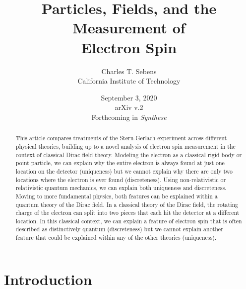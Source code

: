 \documentclass[onecolumn,secnumarabic,amsmath,amssymb,balancelastpage,nofootinbib]{article}
\begin{document}
\sloppy %




\title{\vspace*{-35 pt}\huge{Particles, Fields, and the Measurement of\\Electron Spin}}
\author{Charles T. Sebens\\California Institute of Technology}
\date{September 3, 2020\\arXiv v.2\\Forthcoming in \emph{Synthese}}


\maketitle
\vspace*{-20 pt}
\begin{abstract}
This article compares treatments of the Stern-Gerlach experiment across different physical theories, building up to a novel analysis of electron spin measurement in the context of classical Dirac field theory.  Modeling the electron as a classical rigid body or point particle, we can explain why the entire electron is always found at just one location on the detector (uniqueness) but we cannot explain why there are only two locations where the electron is ever found (discreteness).  Using non-relativistic or relativistic quantum mechanics, we can explain both uniqueness and discreteness.  Moving to more fundamental physics, both features can be explained within a quantum theory of the Dirac field.  In a classical theory of the Dirac field, the rotating charge of the electron can split into two pieces that each hit the detector at a different location.  In this classical context, we can explain a feature of electron spin that is often described as distinctively quantum (discreteness) but we cannot explain another feature that could be explained within any of the other theories (uniqueness).
\end{abstract}

\tableofcontents
\newpage





\section{Introduction}\label{introsec}
\end{document}
